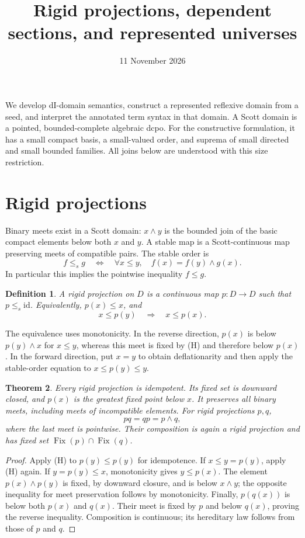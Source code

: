 \documentclass[11pt]{article}
\title{Rigid projections, dependent sections, and represented universes}
\author{}
\date{11 November 2026}
\newtheorem{theorem}{Theorem}[section]
\newtheorem{definition}[theorem]{Definition}
\newcommand{\Fix}{\operatorname{Fix}}
\newcommand{\id}{\mathrm{id}}
\begin{document}
\maketitle

We develop dI-domain semantics, construct a represented reflexive domain
from a seed, and interpret the annotated term syntax in that domain. A Scott domain
is a pointed, bounded-complete algebraic dcpo. For the constructive
formulation, it has a small compact basis, a small-valued order, and
suprema of small directed and small bounded families. All joins below
are understood with this size restriction.

\section{Rigid projections}

Binary meets exist in a Scott domain: $x\wedge y$ is the bounded join of
the basic compact elements below both $x$ and $y$. A stable map is a
Scott-continuous map preserving meets of compatible pairs. The stable
order is
\[
 f\le_s g\quad\Longleftrightarrow\quad
 \forall x\le y,\quad f(x)=f(y)\wedge g(x).
\]
In particular this implies the pointwise inequality $f\le g$.

\begin{definition}
A rigid projection on $D$ is a continuous map $p:D\to D$ such that
$p\le_s\id$. Equivalently, $p(x)\le x$, and
\[
 x\le p(y)\quad\Longrightarrow\quad x\le p(x).
\tag{H}
\]
\end{definition}
The equivalence uses monotonicity. In the reverse direction, $p(x)$ is
below $p(y)\wedge x$ for $x\le y$, whereas this meet is fixed by (H) and
therefore below $p(x)$. In the forward direction, put $x=y$ to obtain
deflationarity and then apply the stable-order equation to $x\le p(y)\le y$.

\begin{theorem}
Every rigid projection is idempotent. Its fixed set is downward closed,
and $p(x)$ is the greatest fixed point below $x$. It preserves all binary
meets, including meets of incompatible elements. For rigid projections
$p,q$,
\[
 pq=qp=p\wedge q,
\]
where the last meet is pointwise. Their composition is again a rigid
projection and has fixed set $\Fix(p)\cap\Fix(q)$.
\end{theorem}
\begin{proof}
Apply (H) to $p(y)\le p(y)$ for idempotence. If $x\le y=p(y)$,
apply (H) again. If $y=p(y)\le x$, monotonicity gives $y\le p(x)$.
The element $p(x)\wedge p(y)$ is fixed, by downward closure, and is below
$x\wedge y$; the opposite inequality for meet preservation follows
by monotonicity. Finally, $p(q(x))$ is below both $p(x)$ and $q(x)$.
Their meet is fixed by $p$ and below $q(x)$, proving the reverse inequality.
Composition is continuous; its hereditary law follows from those of
$p$ and $q$.
\end{proof}
\end{document}

